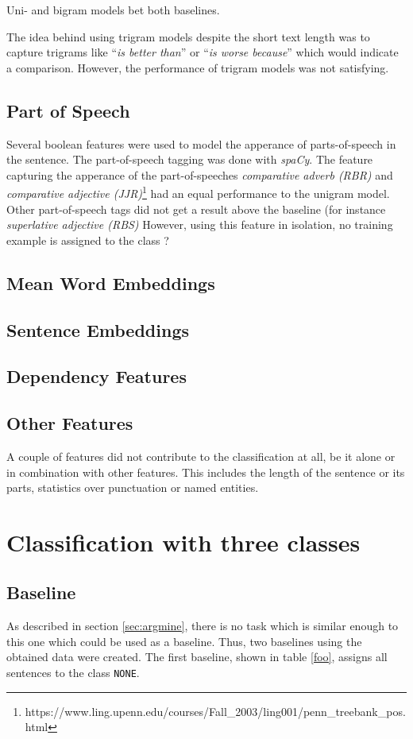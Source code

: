 Uni- and bigram models bet both baselines.

The idea behind using trigram models despite the short text length was to capture trigrams like \enquote{\emph{is better than}} or \enquote{\emph{is worse because}} which would indicate a comparison. However, the performance of trigram models was not satisfying.
\label{sec:ngrams}

\subsection{Part of Speech}
Several boolean features were used to model the apperance of parts-of-speech in the sentence. The part-of-speech tagging was done with \emph{spaCy}. The feature capturing the apperance of the part-of-speeches \emph{comparative adverb (RBR)} and \emph{comparative adjective (JJR)}\footnote{https://www.ling.upenn.edu/courses/Fall\_2003/ling001/penn\_treebank\_pos.html} had an equal performance to the unigram model. Other part-of-speech tags did not get a result above the baseline (for instance \emph{superlative adjective (RBS)} However, using this feature in isolation, no training example is assigned to the class ?

\subsection{Mean Word Embeddings}

\subsection{Sentence Embeddings}
\subsection{Dependency Features}
\subsection{Other Features}
A couple of features did not contribute to the classification at all, be it alone or in combination with other features. This includes the length of the sentence or its parts, statistics over punctuation or named entities.

\section{Classification with three classes}
\subsection{Baseline}
\label{sec:baseline}
As described in section \ref{sec:argmine}, there is no task which is similar enough to this one which could be used as a baseline. Thus, two baselines using the obtained data were created. The first baseline, shown in table \ref{foo}, assigns all sentences to the class \texttt{NONE}.


